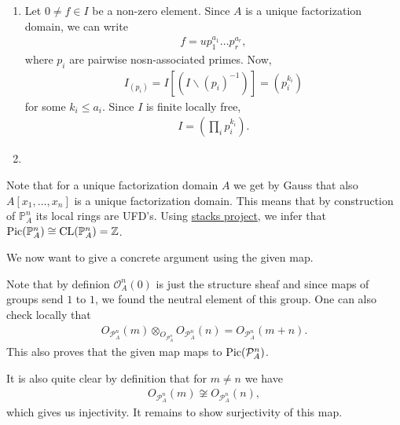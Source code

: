 \newcommand{\sheet}{8}




\maketitle{}

\begin{exercise}{1}
    \begin{enumerate}
        \item  Let $0\not = f \in I$ be a non-zero element. Since $A$ is a unique factorization domain,
        we can write 
        \begin{align*}
            f=u{p}_1^{a_1}\dots {p}_r^{a_r},
        \end{align*}
        where ${p}_i$ are pairwise nosn-associated primes.
        Now, 
        \begin{align*}
            I_({p}_i)=I[(I\backslash (p_i)^{-1})]=(p_i^{k_i})
        \end{align*}
        for some $k_i\leq a_i.$
        Since $I$ is finite locally free, 
        \begin{align*}
            I=(\prod_i p_i^{k_i}).
        \end{align*}
        \item 
    \end{enumerate}
\end{exercise}

\begin{exercise}{2}
    Note that for a unique factorization domain $A$ we get by Gauss that also $A[x_1,\dots, x_n]$ is a unique factorization domain.
    This means that by construction of $\mathbb{P}_A^n$ its local rings are UFD's. Using \href{https://stacks.math.columbia.edu/tag/0BE9}{stacks project},
    we infer that $\operatorname{Pic}(\mathbb{P}_A^n)\cong \operatorname{CL}(\mathbb{P}_A^n)=\mathbb{Z}$.

    We now want to give a concrete argument using the given map.

    Note that by definion $\mathcal{O}^n_A(0)$ is just the structure sheaf and since maps of groups send $1$ to $1$, we found
    the neutral element of this group. One can also check locally that 
    \begin{align*}
       O_{\mathcal{P}^n_A}(m)\otimes_{O_{\mathcal{P}^n_A}} O_{\mathcal{P}^n_A}(n) = O_{\mathcal{P}^n_A}(m+n).
    \end{align*}
    This also proves that the given map maps to $\operatorname{Pic}(\mathcal{P}^n_A)$.

    It is also quite clear by definition that for $m\not=n$ we have
    \begin{align*}
        O_{\mathcal{P}^n_A}(m)\not \cong O_{\mathcal{P}^n_A}(n),
    \end{align*}
    which gives us injectivity.
    It remains to show surjectivity of this map.
\end{exercise}

